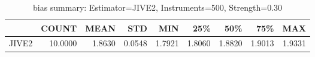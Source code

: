 \begin{table}[ht]
\centering
\caption{bias summary: Estimator=JIVE2, Instruments=500, Strength=0.30}
\begin{tabular}{lrrrrrrrr}
\toprule
 & COUNT & MEAN & STD & MIN & 25\% & 50\% & 75\% & MAX \\
\midrule
JIVE2 & 10.0000 & 1.8630 & 0.0548 & 1.7921 & 1.8060 & 1.8820 & 1.9013 & 1.9331 \\
\bottomrule
\end{tabular}
\end{table}

